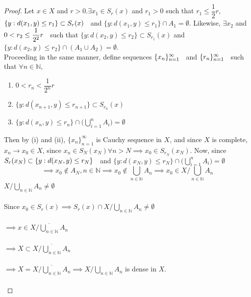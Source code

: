 \documentclass[11pt,a4paper]{article}
\theoremstyle{definition}
\begin{document}
\begin{proof}
Let $x\in X$ and $r>0$.$\exists x_1\in S_r(x)$ and $r_1>0$ such that $r_1\leq \dfrac{1}{2}r$, \hspace{0.2cm}$\{y: d(x_1,y)\leq r_1\}\subset S_r(x)\hspace{0.2cm}$ and $\{y:d(x_1,y)\leq r_1\}\cap A_1=\emptyset$. Likewise, $\exists x_2$ and $0<r_2\leq \dfrac{1}{2^2}r\hspace{0.2cm}$ such that $\{y:d(x_2,y)\leq r_2\}\subset S_{r_1}(x)$ and \hspace{0.2cm}$\{y:d(x_2,y)\leq r_2\}\cap (A_1\cup A_2)=\emptyset.$\\ Proceeding in the same manner, define sequences $\{x_n\}^{\infty}_{n=1}\hspace{0.2cm}$\hspace{0.2cm} and \hspace{0.2cm}$\{r_n\}^{\infty}_{n=1}\hspace{0.2cm}$ such that $\forall n\in \mathbb{N}$,
\begin{enumerate}
\item[i] $0<r_n<\dfrac{1}{2^n}r$
\item[ii] $\{y:d(x_{n+1},y)\leq r_{n+1}\}\subset S_{r_n}(x)$
\item[iii] $\{y:d(x_n,y)\leq r_n\}\cap \Big (\bigcup^n_{i=1}A_i\Big)=\emptyset$
\end{enumerate}
Then by (i) and (ii), $\{x_n\}^{\infty}_{n=1}$ is Cauchy sequence in $X$, and since $X$ is complete, $x_n\rightarrow x_0\in X$, since $x_n\in S_N(x_N) \forall n>N\implies x_0\in S_{r_N}(x_N)$. Now, since \hspace{0.2cm}$S_r(x_N)\subset \{y:d(x_N,y)\leq r_N\}\hspace{0.2cm}$ and \hspace{0.2cm}$\displaystyle{\{y:d(x_N,y)\leq r_N\}\cap \Big(\bigcup_{i=1}^nA_i\Big)=\emptyset}$ $$\implies x_0\not\in A_N, n\in \mathbb{N}\implies x_0\not\in \bigcup_{n\in \mathbb{N}}A_n\implies x_0\in X/\bigcup_{n\in \mathbb{N}}A_n$$ $X/\bigcup_{n\in \mathbb{N}}A_n\neq \emptyset$\\\\ Since $x_0\in S_r(x)\implies S_r(x)\cap X/\bigcup_{n\in \mathbb{N}}A_n\neq \emptyset$\\\\ $\implies x\in \overline{X/\bigcup_{n\in \mathbb{N}}A_n}$\\\\ $\implies X\subset \overline{X/\bigcup_{n\in \mathbb{N}}A_n}$\\\\ $\implies X=\overline{X/\bigcup_{n\in \mathbb{N}}A_n}\implies X/\bigcup_{n\in \mathbb{N}}A_n$ is dense in $X$.\\\\
\end{proof}
\end{document}
